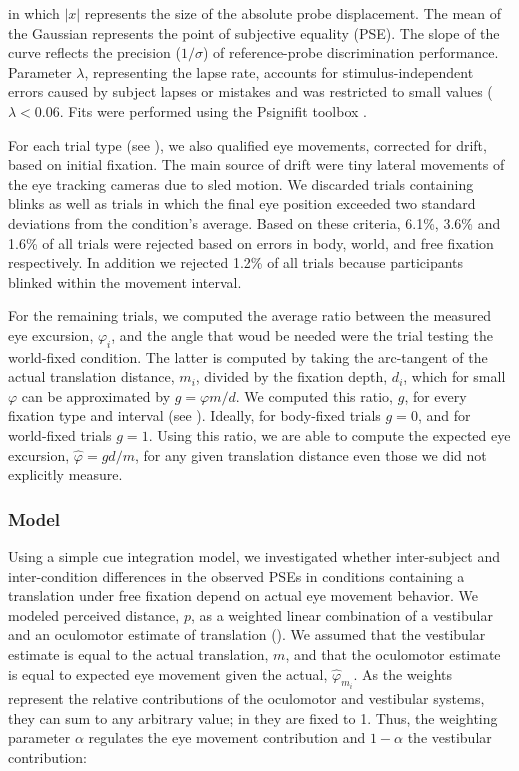 in which $|x|$ represents the size of the absolute probe displacement. The mean of the Gaussian represents the point of subjective equality (PSE). The slope of the curve reflects the precision ($1/\sigma$) of reference-probe discrimination performance. Parameter $\lambda$, representing the lapse rate, accounts for stimulus-independent errors caused by subject lapses or mistakes and was restricted to small values ($\lambda < 0.06$. Fits were performed using the Psignifit toolbox \cite{wichmann2001,wichmann2001b}.

For each trial type (see ), we also qualified eye movements, corrected for drift, based on initial fixation. The main source of drift were tiny lateral movements of the eye tracking cameras due to sled motion. We discarded trials containing blinks as well as trials in which the final eye position exceeded two standard deviations from the condition's average. Based on these criteria, 6.1\%, 3.6\% and 1.6\% of all trials were rejected based on errors in body, world, and free fixation respectively. In addition we rejected 1.2\% of all trials because participants blinked within the movement interval.

For the remaining trials, we computed the average ratio between the measured eye excursion, $\varphi_i$, and the angle that woud be needed were the trial testing the world-fixed condition. The latter is computed by taking the arc-tangent of the actual translation distance, $m_i$, divided by the fixation depth, $d_i$, which for small $\varphi$ can be approximated by $g = \varphi m/d$. We computed this ratio, $g$, for every fixation type and interval (see ). Ideally, for body-fixed trials $g = 0$, and for world-fixed trials $g = 1$. Using this ratio, we are able to compute the expected eye excursion, $\hat{\varphi} = gd/m$, for any given translation distance even those we did not explicitly measure.

\subsubsection{Model}

Using a simple cue integration model, we investigated whether inter-subject and inter-condition differences in the observed PSEs in conditions containing a translation under free fixation depend on actual eye movement behavior. We modeled perceived distance, $p$, as a weighted linear combination of a vestibular and an oculomotor estimate of translation (). We assumed that the vestibular estimate is equal to the actual translation, $m$, and that the oculomotor estimate is equal to expected eye movement given the  actual, $\hat{\varphi}_{m_i}$. As the weights represent the relative contributions of the oculomotor and vestibular systems, they can sum to any arbitrary value; in  they are fixed to 1. Thus, the weighting parameter $\alpha$ regulates the eye movement contribution and $1 - \alpha$  the vestibular contribution:

